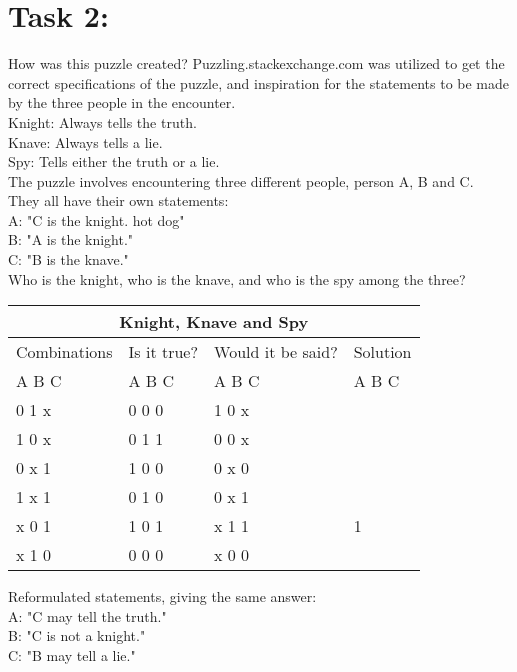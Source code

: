 \documentclass[11pt]{amsart}
\begin{document}
\section{Task 2:}

How was this puzzle created?
	Puzzling.stackexchange.com was utilized to get the correct specifications of the puzzle,
	and inspiration for the statements to be made by the three people in the encounter. \\

Knight: Always tells the truth.\\
Knave: 	Always tells a lie.\\
Spy: 		Tells either the truth or a lie. \\

The puzzle involves encountering three different people, person A, B and C. \\

They all have their own statements: \\

	A: "C is the knight. hot dog"\\
	B: "A is the knight."\\
	C: "B is the knave." \\

Who is the knight, who is the knave, and who is the spy among the three? \\

\begin{tabular}{ |p{3cm}||p{3cm}|p{3cm}|p{3cm}|  }
 \hline
 \multicolumn{4}{|c|}{Knight, Knave and Spy} \\
 \hline
 Combinations & Is it true? & Would it be said? & Solution  \\ A  B  C   &   A  B  C  &   A  B  C & A  B  C \\
 \hline
	0   1   x  	& 0	0	0   & 1 0 x &  \\
	1   0   x		& 0	1	1  	& 0 0 x &  \\
	0   x   1 	&	1	0	0 	& 0 x 0 &  \\
	1   x   1  	&	0	1	0 	& 0 x 1 &  \\
	x   0   1		& 1	0	1  	& x 1 1 & 1\\
	x   1   0		& 0	0	0  	& x 0 0 &  \\

 \hline
\end{tabular}

Reformulated statements, giving the same answer:\\

	A: "C may tell the truth."\\
	B: "C is not a knight."\\
	C: "B may tell a lie." \\
\end{document}
